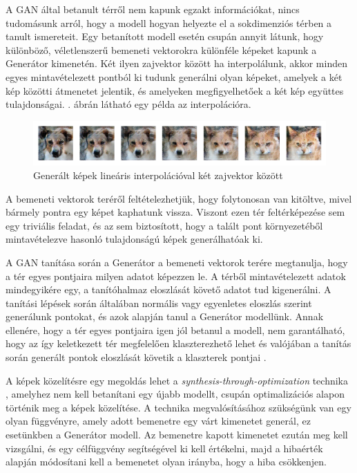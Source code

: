 
A GAN által betanult térről nem kapunk egzakt információkat, nincs tudomásunk arról, hogy a modell hogyan helyezte el a sokdimenziós térben a tanult ismereteit. Egy betanított modell esetén csupán annyit látunk, hogy különböző, véletlenszerű bemeneti vektorokra különféle képeket kapunk a Generátor kimenetén.
Két ilyen zajvektor között ha interpolálunk, akkor minden egyes mintavételezett pontból ki tudunk generálni olyan képeket, amelyek a két kép közötti átmenetet jelentik, és amelyeken megfigyelhetőek a két kép együttes tulajdonságai. . ábrán látható egy példa az interpolációra.

\begin{figure}[h]
\centering
\includegraphics[width=15cm]{images/interpolation.png}
\caption{Generált képek lineáris interpolációval két zajvektor között}
\label{fig:interpolation}
\end{figure}

A bemeneti vektorok teréről feltételezhetjük, hogy folytonosan van kitöltve, mivel bármely pontra egy képet kaphatunk vissza. Viszont ezen tér feltérképezése sem egy triviális feladat, és az sem biztosított, hogy a talált pont környezetéből mintavételezve hasonló tulajdonságú képek generálhatóak ki.

A GAN tanítása során a Generátor a bemeneti vektorok terére megtanulja, hogy a tér egyes pontjaira milyen adatot képezzen le. A térből mintavételezett adatok mindegyikére egy, a tanítóhalmaz eloszlását követő adatot tud kigenerálni.
A tanítási lépések során általában normális vagy egyenletes eloszlás szerint generálunk pontokat, és azok alapján tanul a Generátor modellünk. Annak ellenére, hogy a tér egyes pontjaira igen jól betanul a modell, nem garantálható, hogy az így keletkezett tér megfelelően klaszterezhető lehet és valójában a tanítás során generált pontok eloszlását követik a klaszterek pontjai \cite{mukherjee2019clustergan}.


A képek közelítésre egy megoldás lehet a \textit{synthesis-through-optimization} technika \cite{frans2021clipdraw}, amelyhez nem kell betanítani egy újabb modellt, csupán optimalizációs alapon történik meg a képek közelítése.
A technika megvalósításához szükségünk van egy olyan függvényre, amely adott bemenetre egy várt kimenetet generál, ez esetünkben a Generátor modell. Az bemenetre kapott kimenetet ezután meg kell vizsgálni, és egy célfüggvény segítségével ki kell értékelni, majd a hibaérték alapján módosítani kell a bemenetet olyan irányba, hogy a hiba csökkenjen.

